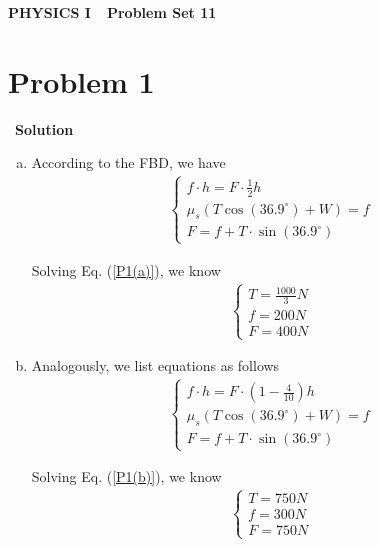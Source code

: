 \documentclass[12pt,a4paper]{article}
\begin{document}
\centerline{\Huge{{\textbf{PHYSICS I\ \ Problem Set 11}}}}
\vspace{0.5cm}
\section*{\large \textbf{Problem 1}}~{\textbf{Solution}}

\begin{enumerate}[(a)]
	\item According to the FBD, we have
	\begin{align}
	\left\{
		\begin{array}{l}			
				f \cdot h = F \cdot \frac{1}{2}h\\
				\mu_s(T\cos(36.9^\circ) + W) = f\\
				F = f + T \cdot \sin(36.9^\circ)
		\end{array}
	\right.
	\label{P1(a)}
	\end{align}
	
	Solving Eq. (\ref{P1(a)}), we know
	\begin{align}
	\left\{
		\begin{array}{l}			
				T = \frac{1000}{3} N\\
				f = 200 N\\
				F = 400N
		\end{array}
	\right.
	\label{P1(a)_sol}
	\end{align}
	
	\item Analogously, we list equations as follows
	\begin{align}
	\left\{
		\begin{array}{l}			
				f \cdot h = F \cdot \left( 1-\frac{4}{10} \right) h\\
				\mu_s(T\cos(36.9^\circ) + W) = f\\
				F = f + T \cdot \sin(36.9^\circ)
		\end{array}
	\right.
	\label{P1(b)}
	\end{align}
	
	Solving Eq. (\ref{P1(b)}), we know
	\begin{align}
	\left\{
		\begin{array}{l}			
				T = 750 N\\
				f = 300 N\\
				F = 750 N
		\end{array}
	\right.
	\label{P1(b)_sol}
	\end{align}
	

\end{enumerate}
\end{document}
